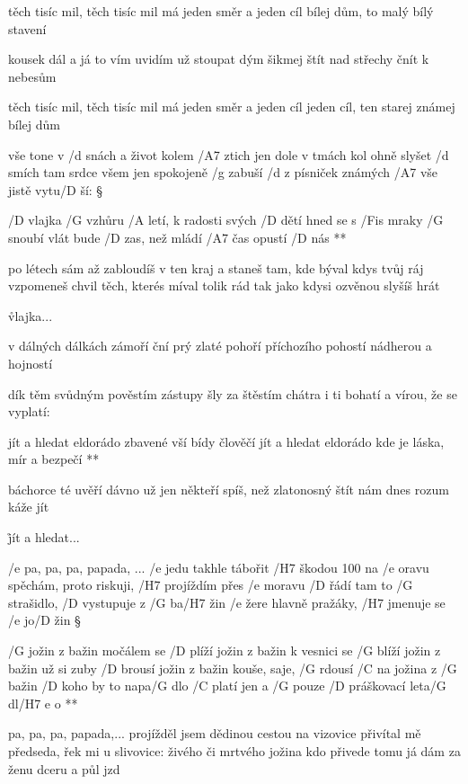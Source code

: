 těch tisíc mil, těch tisíc mil
má jeden směr a jeden cíl
bílej dům, to malý bílý stavení \s

kousek dál a já to vím
uvidím už stoupat dým
šikmej štít nad střechy čnít k nebesům \s

těch tisíc mil, těch tisíc mil
má jeden směr a jeden cíl
jeden cíl, ten starej známej bílej dům




vše tone v /d snách a život kolem /A7 ztich
jen dole v tmách kol ohně slyšet /d smích
tam srdce všem jen spokojeně /g zabuší
/d z písniček známých /A7 vše jistě vytu/D ší: \S

\R /D vlajka /G vzhůru /A letí, k radosti svých /D dětí
   hned se s /Fis mraky /G snoubí
   vlát bude /D zas, než mládí /A7 čas opustí /D nás **

po létech sám až zabloudíš v ten kraj
a staneš tam, kde býval kdys tvůj ráj
vzpomeneš chvil těch, kterés míval tolik rád
tak jako kdysi ozvěnou slyšíš hrát \s

\r vlajka...




v dálných dálkách zámoří
ční prý zlaté pohoří
příchozího pohostí
nádherou a hojností \s

dík těm svůdným pověstím
zástupy šly za štěstím
chátra i ti bohatí
a vírou, že se vyplatí: \s

\R jít a hledat eldorádo
   zbavené vší bídy člověčí
   jít a hledat eldorádo
   kde je láska, mír a bezpečí **

báchorce té uvěří
dávno už jen někteří
spíš, než zlatonosný štít
nám dnes rozum káže  jít \s

\r jít a hledat...




/e pa, pa, pa, papada, ...
/e jedu takhle tábořit /H7 škodou 100 na /e oravu
spěchám, proto riskuji, /H7 projíždím přes /e moravu
/D řádí tam to /G strašidlo, /D vystupuje z /G ba/H7 žin
/e žere hlavně pražáky, /H7 jmenuje se /e jo/D žin \S

\R /G jožin z bažin močálem se /D plíží
   jožin z bažin k vesnici se /G blíží
   jožin z bažin už si zuby /D brousí
   jožin z bažin kouše, saje, /G rdousí
   /C na jožina z /G bažin /D koho by to napa/G dlo
   /C platí jen a /G pouze /D práškovací leta/G dl/{H7 e} o **

pa, pa, pa, papada,...
projížděl jsem dědinou cestou na vizovice
přivítal mě předseda, řek mi u slivovice:
živého či mrtvého jožina kdo přivede
tomu já dám za ženu dceru a půl jzd \s

